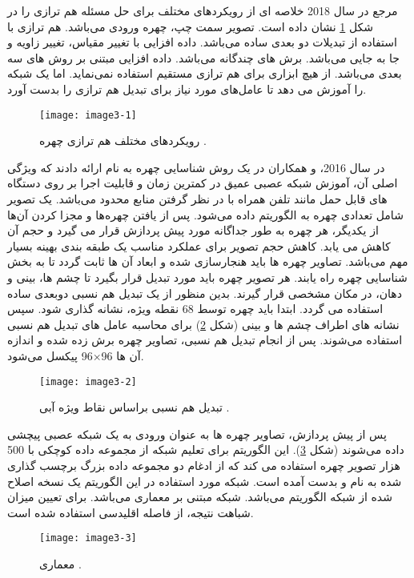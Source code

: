 مرجع \cite{Masi2018DeepFR} در سال 2018 خلاصه ای از رویکردهای مختلف برای حل مسئله هم ترازی را در شکل \ref{image3-1} نشان داده است. تصویر سمت چپ، چهره ورودی می‌باشد.  هم ترازی با استفاده از تبدیلات دو بعدی ساده می‌باشد.  داده افزایی  با تغییر مقیاس، تغییر زاویه و جا به جایی می‌باشد.  برش های چندگانه می‌باشد.  داده افزایی مبتنی بر روش های سه بعدی می‌باشد.  از هیچ ابزاری برای هم ترازی مستقیم استفاده نمی‌نماید. اما یک شبکه را آموزش می دهد تا عامل‌های مورد نیاز برای تبدیل هم ترازی را بدست آورد.

\begin{figure}[h]
\centering
  \texttt{[image: image3-1]}
  \caption{رویکردهای مختلف هم ترازی چهره \cite{Masi2018DeepFR}.}
  \label{image3-1}
\end{figure}

\noindent
در سال 2016،  و همکاران در \cite{amos2016openface} یک روش شناسایی چهره به نام  ارائه دادند که ویژگی اصلی آن، آموزش شبکه عصبی عمیق در کمترین زمان و قابلیت اجرا بر روی دستگاه های قابل حمل مانند تلفن همراه با در نظر گرفتن منابع محدود می‌باشد. یک تصویر شامل تعدادی چهره به الگوریتم داده می‌شود. پس از یافتن چهره‌ها و مجزا کردن  آن‌ها از یکدیگر، هر چهره به طور جداگانه مورد پیش پردازش  قرار می گیرد و حجم آن کاهش می یابد. کاهش حجم تصویر برای عملکرد مناسب یک طبقه بندی بهینه بسیار مهم می‌باشد. تصاویر چهره ها باید هنجارسازی شده و ابعاد آن ها ثابت گردد تا به بخش شناسایی چهره راه یابند. هر تصویر چهره باید مورد تبدیل قرار بگیرد تا چشم ها، بینی و دهان، در مکان مشخصی قرار گیرند. بدین منظور از یک تبدیل هم نسبی  دوبعدی ساده استفاده می گردد. ابتدا باید چهره توسط 68 نقطه ویژه، نشانه گذاری شود. سپس نشانه های اطراف چشم ها و بینی (شکل \ref{image3-2}) برای محاسبه عامل های تبدیل هم نسبی استفاده می‌شوند. پس از انجام تبدیل هم نسبی، تصاویر چهره برش زده شده و اندازه آن ها 96×96 پیکسل می‌شود.

\begin{figure}[h]
\centering
  \texttt{[image: image3-2]}
  \caption{
  تبدیل هم نسبی  براساس نقاط ویژه آبی  
  \cite{amos2016openface}.}
  \label{image3-2}
\end{figure}

\noindent‏ 
پس از پیش پردازش، تصاویر چهره ها به عنوان ورودی به یک شبکه عصبی پیچشی داده می‌شوند (شکل \ref{image3-3}). این الگوریتم برای تعلیم شبکه از مجموعه داده کوچکی با 500 هزار تصویر چهره استفاده می کند که از ادغام دو مجموعه داده بزرگ برچسب گذاری شده به نام  و  بدست آمده است. شبکه مورد استفاده در این الگوریتم یک نسخه اصلاح شده از شبکه  الگوریتم  می‌باشد. شبکه  مبتنی بر معماری  می‌باشد. برای تعیین میزان شباهت نتیجه، از فاصله اقلیدسی استفاده شده است.
 \begin{figure}[h]
\centering
  \texttt{[image: image3-3]}
  \caption{معماری   \cite{amos2016openface}.}
  \label{image3-3}
\end{figure}

